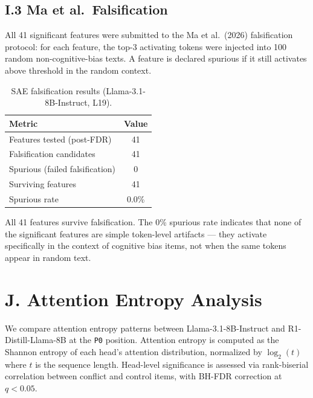 \documentclass[accepted]{article}
\newcommand{\pzero}{\texttt{P0}}
\begin{document}
\subsection*{I.3 Ma et al.\ Falsification}

All 41 significant features were submitted to the Ma et al.\ (2026)
falsification protocol: for each feature, the top-3 activating tokens
were injected into 100 random non-cognitive-bias texts.  A feature
is declared spurious if it still activates above threshold in the
random context.

\begin{table}[ht]
\centering
\caption{SAE falsification results (Llama-3.1-8B-Instruct, L19).}
\label{tab:sae_falsification}
\vspace{4pt}
\small
\begin{tabular}{lc}
\toprule
\textbf{Metric} & \textbf{Value} \\
\midrule
Features tested (post-FDR)      & 41 \\
Falsification candidates        & 41 \\
Spurious (failed falsification) & 0 \\
Surviving features              & 41 \\
Spurious rate                   & 0.0\% \\
\bottomrule
\end{tabular}
\end{table}

\noindent All 41 features survive falsification.  The 0\% spurious
rate indicates that none of the significant features are simple
token-level artifacts --- they activate specifically in the context
of cognitive bias items, not when the same tokens appear in random
text.


\section*{J. Attention Entropy Analysis}
\label{sec:appendix_attention}

We compare attention entropy patterns between Llama-3.1-8B-Instruct
and R1-Distill-Llama-8B at the \pzero{} position.  Attention entropy
is computed as the Shannon entropy of each head's attention
distribution, normalized by $\log_2(t)$ where $t$ is the sequence
length.  Head-level significance is assessed via rank-biserial
correlation between conflict and control items, with BH-FDR
correction at $q < 0.05$.
\end{document}
